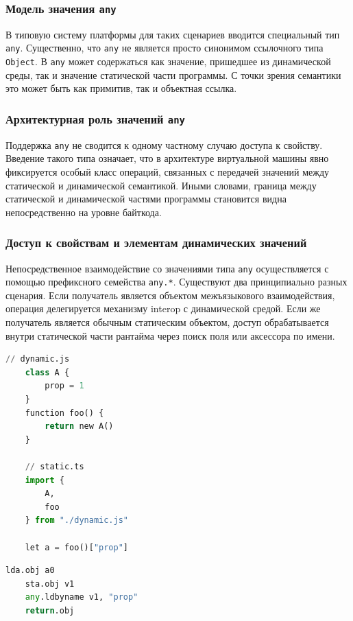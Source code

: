 \subsubsection{Модель значения \texttt{any}}

В типовую систему платформы для таких сценариев вводится специальный тип \texttt{any}. Существенно, что
\texttt{any} не является просто синонимом ссылочного типа \texttt{Object}. В \texttt{any} может
содержаться как значение, пришедшее из динамической среды, так и значение статической части
программы. С точки зрения семантики это может быть как примитив, так и объектная ссылка.

\subsubsection{Архитектурная роль значений \texttt{any}}

Поддержка \texttt{any} не сводится к одному частному случаю доступа к свойству. Введение такого
типа означает, что в архитектуре виртуальной машины явно фиксируется особый класс операций,
связанных с передачей значений между статической и динамической семантикой. Иными словами, граница
между статической и динамической частями программы становится видна непосредственно на уровне
байткода.

\subsubsection{Доступ к свойствам и элементам динамических значений}

Непосредственное взаимодействие со значениями типа \texttt{any} осуществляется с помощью префиксного
семейства \texttt{any.*}. Существуют два принципиально
разных сценария. Если получатель является объектом межъязыкового взаимодействия, операция 
делегируется механизму interop с динамической средой.
Если же получатель является обычным статическим объектом, доступ обрабатывается внутри статической части
рантайма через поиск поля или аксессора по имени.
\begin{lstlisting}[language=Python, label={lst:any_example}, caption={Пример взаимодействия со значением из динамической среды}]
    // dynamic.js
    class A { 
        prop = 1
    }
    function foo() { 
        return new A() 
    }

    // static.ts
    import { 
        A, 
        foo
    } from "./dynamic.js"
    
    let a = foo()["prop"]
\end{lstlisting}
\begin{lstlisting}[language=Python, label={lst:any_bc}, caption={Представление кода из Листинга~\ref{lst:any_example} на уровне байткода}]
    lda.obj a0
    sta.obj v1
    any.ldbyname v1, "prop"
    return.obj
\end{lstlisting}


